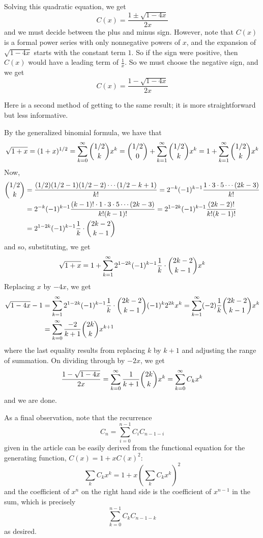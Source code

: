 \documentclass[12pt]{article}
\begin{document}
Solving this quadratic equation, we get
\[C(x)=\frac{1\pm\sqrt{1-4x}}{2x}\]
and we must decide between the plus and minus sign. However, note that $C(x)$ is a formal power series with only nonnegative powers of $x$, and the expansion of $\sqrt{1-4x}$ starts with the constant term $1$. So if the sign were positive, then $C(x)$ would have a leading term of $\frac{1}{x}$. So we must choose the negative sign, and we get
\[C(x)=\frac{1-\sqrt{1-4x}}{2x}\]

Here is a second method of getting to the same result; it is more straightforward but less informative.

By the generalized binomial formula, we have that
\[\sqrt{1+x}=(1+x)^{1/2}=\sum_{k=0}^{\infty}\dbinom{1/2}{k}x^k=\dbinom{1/2}{0}+\sum_{k=1}^{\infty}\dbinom{1/2}{k}x^k=1+\sum_{k=1}^{\infty}\dbinom{1/2}{k}x^k\]
Now,
\begin{align*}\dbinom{1/2}{k}&=\frac{(1/2)(1/2-1)(1/2-2)\cdots(1/2-k+1)}{k!}=2^{-k}(-1)^{k-1}\frac{1\cdot 3\cdot 5\cdots(2k-3)}{k!}\\
&=2^{-k}(-1)^{k-1}\frac{(k-1)!\cdot 1\cdot 3\cdot 5\cdots(2k-3)}{k!(k-1)!}=2^{1-2k}(-1)^{k-1}\frac{(2k-2)!}{k!(k-1)!}\\
&=2^{1-2k}(-1)^{k-1}\frac{1}{k}\cdot\dbinom{2k-2}{k-1}
\end{align*}
and so, substituting, we get
\[\sqrt{1+x}=1+\sum_{k=1}^{\infty}2^{1-2k}(-1)^{k-1}\frac{1}{k}\cdot\dbinom{2k-2}{k-1}x^k\]
Replacing $x$ by $-4x$, we get
\begin{align*}
\sqrt{1-4x}-1&=\sum_{k=1}^{\infty}2^{1-2k}(-1)^{k-1}\frac{1}{k}\cdot\dbinom{2k-2}{k-1}(-1)^k2^{2k}x^k =\sum_{k=1}^{\infty}(-2)\frac{1}{k}\dbinom{2k-2}{k-1}x^k\\
&=\sum_{k=0}^{\infty}\frac{-2}{k+1}\dbinom{2k}{k}x^{k+1}
\end{align*}
where the last equality results from replacing $k$ by $k+1$ and adjusting the range of summation. On dividing through by $-2x$, we get
\[\frac{1-\sqrt{1-4x}}{2x}=\sum_{k=0}^{\infty}\frac{1}{k+1}\dbinom{2k}{k}x^k=\sum_{k=0}^{\infty}C_kx^k\]
and we are done.

As a final observation, note that the recurrence
\[C_n=\sum_{i=0}^{n-1} C_i C_{n-1-i}\]
given in the  article can be easily derived from the functional equation for the generating function, $C(x)=1+xC(x)^2$:
\[\sum_k C_kx^k=1+x\left(\sum_k C_kx^k\right)^2\]
and the coefficient of $x^n$ on the right hand side is the coefficient of $x^{n-1}$ in the sum, which is precisely
\[\sum_{k=0}^{n-1} C_k C_{n-1-k}\]
as desired.
\end{document}
